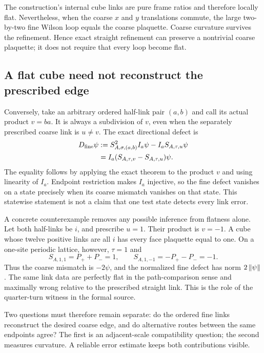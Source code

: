 The construction's internal cube links are pure frame ratios and therefore locally flat. Nevertheless, when the coarse $x$ and $y$ translations commute, the large two-by-two fine Wilson loop equals the coarse plaquette. Coarse curvature survives the refinement. Hence exact straight refinement can preserve a nontrivial coarse plaquette; it does not require that every loop become flat.

\subsection{A flat cube need not reconstruct the prescribed edge}
Conversely, take an arbitrary ordered half-link pair $(a,b)$ and call its actual product $v=ba$. It is always a subdivision of $v$, even when the separately prescribed coarse link is $u\ne v$. The exact directional defect is
\begin{align}
 D_{\rm fine}\psi
  &:=S_{A,\sigma,(a,b)}^2I_a\psi-I_aS_{A,\tau,u}\psi\notag\\
  &=I_a(S_{A,\tau,v}-S_{A,\tau,u})\psi.
 \label{g:exact-mismatch}
\end{align}
The equality follows by applying the exact theorem to the product $v$ and using linearity of $I_a$. Endpoint restriction makes $I_a$ injective, so the fine defect vanishes on a state precisely when its coarse mismatch vanishes on that state. This statewise statement is not a claim that one test state detects every link error.

A concrete counterexample removes any possible inference from flatness alone. Let both half-links be $i$, and prescribe $u=1$. Their product is $v=-1$. A cube whose twelve positive links are all $i$ has every face plaquette equal to one. On a one-site periodic lattice, however, $\tau=1$ and
\[
 S_{A,1,1}=P_++P_-=1,\qquad
 S_{A,1,-1}=-P_+-P_-=-1.
\]
Thus the coarse mismatch is $-2\psi$, and the normalized fine defect has norm $2\left\lVert\psi\right\rVert$. The same link data are perfectly flat in the path-comparison sense and maximally wrong relative to the prescribed straight link. This is the role of the quarter-turn witness in the formal source.

Two questions must therefore remain separate: do the ordered fine links reconstruct the desired coarse edge, and do alternative routes between the same endpoints agree? The first is an adjacent-scale compatibility question; the second measures curvature. A reliable error estimate keeps both contributions visible.



